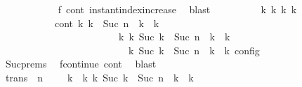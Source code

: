 \begin{isabellebody}
\ \ \ \ \ \ \ \ \ \ \isamarkupfalse%
\ f{}\ cont\ instant{\isacharunderscore}index{\isacharunderscore}increase\ \isamarkupfalse%
\ blast\isanewline
\ \ \ \ \ \ \ \ \isamarkupfalse%
\ {\isasymGamma}\isactrlsub k{\isacharprime}\ {\isasymPsi}\isactrlsub k{\isacharprime}\ {\isasymPhi}\isactrlsub k{\isacharprime}\ k{\isacharprime}\isanewline
\ \ \ \ \ \ \ \ \ \ \ cont{}{\isacharcolon}\ {\isacartoucheopen}{\isacharparenleft}{\isacharparenleft}{\isasymGamma}\isactrlsub k{\isacharcomma}\ {\isasymdelta}k\ {\isacharplus}\ Suc\ n\ {\isasymturnstile}\ {\isasymPsi}\isactrlsub k\ {\isasymtriangleright}\ {\isasymPhi}\isactrlsub k{\isacharparenright}\isanewline
\ \ \ \ \ \ \ \ \ \ \ \ \ \ \ \ \ \ \ \ \ \ \ \ {\isasymhookrightarrow}\isactrlbsup k{\isacharprime}\isactrlesup \ {\isacharparenleft}{\isasymGamma}\isactrlsub k{\isacharprime}{\isacharcomma}\ Suc\ {\isacharparenleft}{\isasymdelta}k\ {\isacharplus}\ Suc\ n{\isacharparenright}\ {\isasymturnstile}\ {\isasymPsi}\isactrlsub k{\isacharprime}\ {\isasymtriangleright}\ {\isasymPhi}\isactrlsub k{\isacharprime}{\isacharparenright}{\isacharparenright}\isanewline
\ \ \ \ \ \ \ \ \ \ \ \ \ \ \ \ \ \ \ \ \ \ {\isasymand}\ {\isasymrho}\ {\isasymin}\ {\isasymlbrakk}\ {\isasymGamma}\isactrlsub k{\isacharprime}{\isacharcomma}\ Suc\ {\isacharparenleft}{\isasymdelta}k\ {\isacharplus}\ Suc\ n{\isacharparenright}\ {\isasymturnstile}\ {\isasymPsi}\isactrlsub k{\isacharprime}\ {\isasymtriangleright}\ {\isasymPhi}\isactrlsub k{\isacharprime}\ {\isasymrbrakk}\isactrlsub c\isactrlsub o\isactrlsub n\isactrlsub f\isactrlsub i\isactrlsub g{\isacartoucheclose}\isanewline
\ \ \ \ \ \ \ \ \ \ \isamarkupfalse%
\ Suc{\isachardot}prems\ \isamarkupfalse%
\ fcontinue\ cont\ \isamarkupfalse%
\ blast\isanewline
\ \ \ \ \ \ \ \ \isamarkupfalse%
\ trans{\isacharcolon}\ {\isacartoucheopen}{\isacharparenleft}{\isasymGamma}{\isacharcomma}\ n\ {\isasymturnstile}\ {\isasymPsi}\ {\isasymtriangleright}\ {\isasymPhi}{\isacharparenright}\ {\isasymhookrightarrow}\isactrlbsup k\ {\isacharplus}\ k{\isacharprime}\isactrlesup \ {\isacharparenleft}{\isasymGamma}\isactrlsub k{\isacharprime}{\isacharcomma}\ Suc\ {\isacharparenleft}{\isasymdelta}k\ {\isacharplus}\ Suc\ n{\isacharparenright}\ {\isasymturnstile}\ {\isasymPsi}\isactrlsub k{\isacharprime}\ {\isasymtriangleright}\ {\isasymPhi}\isactrlsub k{\isacharprime}{\isacharparenright}{\isacartoucheclose}\isanewline
\ \ \ \ \ \ \ \ \ \ \isamarkupfalse%

\end{isabellebody}
